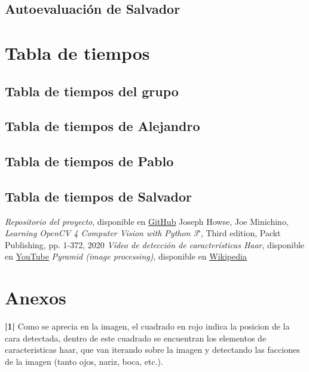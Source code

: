 \documentclass[a4paper]{article}
\begin{document}
\subsection{Autoevaluación de Salvador}

\section{Tabla de tiempos}

\subsection{Tabla de tiempos del grupo}

\subsection{Tabla de tiempos de Alejandro}

\subsection{Tabla de tiempos de Pablo}

\subsection{Tabla de tiempos de Salvador}

\newpage
\begin{thebibliography}{99}
 \textit{Repositorio del proyecto}, disponible en \href{https://github.com/PacktPublishing/Learning-OpenCV-4-Computer-Vision-with-Python-Third-Edition}{GitHub}
 Joseph Howse, Joe Minichino, \textit{Learning OpenCV 4 Computer Vision with Python 3}", Third edition, Packt Publishing, pp. 1-372, 2020
 \textit{Vídeo de detección de características Haar}, disponible en \href{https://youtu.be/hPCTwxF0qf4}{YouTube}
 \textit{Pyramid (image processing)}, disponible en \href{https://en.wikipedia.org/wiki/Pyramid_(image_processing)}{Wikipedia}
\end{thebibliography}

\newpage
\section*{Anexos}
\textbf{|1|} Como se aprecia en la imagen, el cuadrado en rojo indica la posicion de la cara detectada, dentro de este cuadrado se encuentran los elementos de caracteristicas haar, que van iterando sobre la imagen y detectando las facciones de la imagen (tanto ojos, nariz, boca, etc.).
\end{document}
